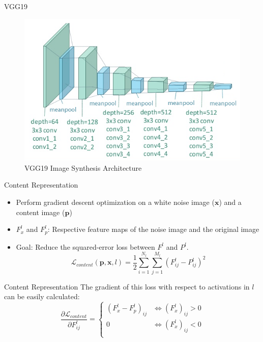 \documentclass{beamer}
\begin{document}
\begin{frame}{VGG19}
\begin{figure}[H]
\centering
\includegraphics[width=.9\textwidth]{img/vgg19/synthesis}
\caption*{ VGG19 Image Synthesis Architecture}
\end{figure}
\end{frame}



\begin{frame}{Content Representation}
    \begin{itemize}
        \item Perform gradient descent optimization on a white noise image
            ($\mathbf{x}$) and a content image ($\mathbf{p}$)
        \item $F_x^l$ and $F_p^l$: Respective feature maps of the noise image
            and the original image
        \item Goal: Reduce the squared-error loss between $F^l$ and $P^l$.
    \begin{equation}
        \mathcal{L}_{content}(\mathbf{p}, \mathbf{x}, l) =
        \frac{1}{2} \sum_{i=1}^{N_l}\sum_{j=1}^{M_l}{(F^l_{ij} - P^l_{ij})^2}
    \end{equation}
    \end{itemize}
\end{frame}



\begin{frame}{Content Representation}
    The gradient of this loss with respect to activations in $l$ can be easily
    calculated:
    \begin{equation}
        \frac{\partial \mathcal{L}_{content}}{\partial F^l_{ij}}
        =
        \begin{cases}
            (F^l_x - F^l_p)_{ij} & \iff (F^l_x)_{ij} > 0 \\
            0 & \iff (F^l_x)_{ij} < 0 \\
        \end{cases}
    \end{equation}
\end{frame}
\end{document}
